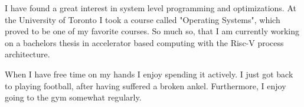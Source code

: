 I have found a great interest in system level programming and optimizations.
At the University of Toronto I took a course called "Operating Systems", which
proved to be one of my favorite courses. So much so, that I am currently working
on a bachelors thesis in accelerator based computing with the Risc-V process architecture.

When I have free time on my hands I enjoy spending it actively. I just got back to playing football,
after having suffered a broken ankel. Furthermore, I enjoy going to the gym somewhat regularly.
